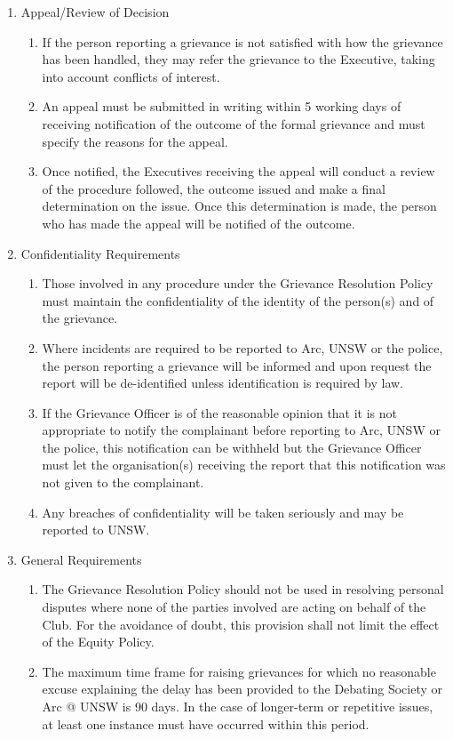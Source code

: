 \begin{enumerate}
\item Appeal/Review of Decision
  \begin{enumerate}
  \item If the person reporting a grievance is not satisfied with how the grievance has been handled, they may refer the grievance to the Executive, taking into account conflicts of interest.
  \item An appeal must be submitted in writing within 5 working days of receiving notification of the outcome of the formal grievance and must specify the reasons for the appeal.
  \item Once notified, the Executives receiving the appeal will conduct a review of the procedure followed, the outcome issued and make a final determination on the issue. Once this determination is made, the person who has made the appeal will be notified of the outcome.
  \end{enumerate}

\item Confidentiality Requirements
  \begin{enumerate}
  \item Those involved in any procedure under the Grievance Resolution Policy must maintain the confidentiality of the identity of the person(s) and of the grievance.
  \item Where incidents are required to be reported to Arc, UNSW or the police, the person reporting a grievance will be informed and upon request the report will be de-identified unless identification is required by law.
  \item If the Grievance Officer is of the reasonable opinion that it is not appropriate to notify the complainant before reporting to Arc, UNSW or the police, this notification can be withheld but the Grievance Officer must let the organisation(s) receiving the report that this notification was not given to the complainant.
  \item Any breaches of confidentiality will be taken seriously and may be reported to UNSW.
  \end{enumerate}

\item General Requirements
  \begin{enumerate}
  \item The Grievance Resolution Policy should not be used in resolving personal disputes where none of the parties involved are acting on behalf of the Club. For the avoidance of doubt, this provision shall not limit the effect of the Equity Policy.
  \item The maximum time frame for raising grievances for which no reasonable excuse explaining the delay has been provided to the Debating Society or Arc @ UNSW is 90 days. In the case of longer-term or repetitive issues, at least one instance must have occurred within this period.
  \end{enumerate}
\end{enumerate}

